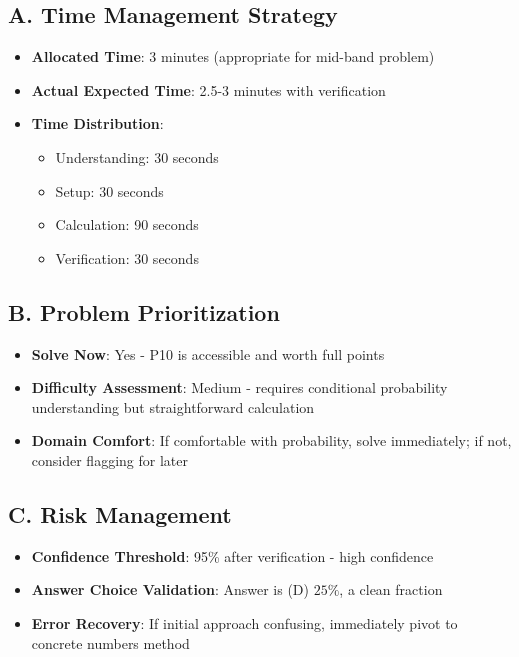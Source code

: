 \documentclass[]{article}
\begin{document}
\begin{competitionbox}
\subsection*{A. Time Management Strategy}
\begin{itemize}[leftmargin=*]
    \item \textbf{Allocated Time}: 3 minutes (appropriate for mid-band problem)
    \item \textbf{Actual Expected Time}: 2.5-3 minutes with verification
    \item \textbf{Time Distribution}:
    \begin{itemize}
        \item Understanding: 30 seconds
        \item Setup: 30 seconds
        \item Calculation: 90 seconds
        \item Verification: 30 seconds
    \end{itemize}
\end{itemize}

\subsection*{B. Problem Prioritization}
\begin{itemize}[leftmargin=*]
    \item \textbf{Solve Now}: Yes - P10 is accessible and worth full points
    \item \textbf{Difficulty Assessment}: Medium - requires conditional probability understanding but straightforward calculation
    \item \textbf{Domain Comfort}: If comfortable with probability, solve immediately; if not, consider flagging for later
\end{itemize}

\subsection*{C. Risk Management}
\begin{itemize}[leftmargin=*]
    \item \textbf{Confidence Threshold}: 95\% after verification - high confidence
    \item \textbf{Answer Choice Validation}: Answer is (D) $25\%$, a clean fraction
    \item \textbf{Error Recovery}: If initial approach confusing, immediately pivot to concrete numbers method
\end{itemize}


\end{competitionbox}
\end{document}

